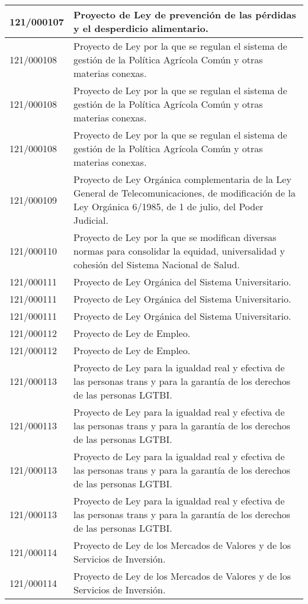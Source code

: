 {\begin{table}[H]
\begin{center}
\begin{tabularx}{\linewidth}{| l | X |}
\hline
121/000107 & Proyecto de Ley de prevención de las pérdidas y el desperdicio alimentario. \\
\hline
121/000108 & Proyecto de Ley por la que se regulan el sistema de gestión de la Política Agrícola Común y otras materias conexas. \\
\hline
121/000108 & Proyecto de Ley por la que se regulan el sistema de gestión de la Política Agrícola Común y otras materias conexas. \\
\hline
121/000108 & Proyecto de Ley por la que se regulan el sistema de gestión de la Política Agrícola Común y otras materias conexas. \\
\hline
121/000109 & Proyecto de Ley Orgánica complementaria de la Ley General de Telecomunicaciones, de modificación de la Ley Orgánica 6/1985, de 1 de julio, del Poder Judicial. \\
\hline
121/000110 & Proyecto de Ley por la que se modifican diversas normas para consolidar la equidad, universalidad y cohesión del Sistema Nacional de Salud. \\
\hline
121/000111 & Proyecto de Ley Orgánica del Sistema Universitario. \\
\hline
121/000111 & Proyecto de Ley Orgánica del Sistema Universitario. \\
\hline
121/000111 & Proyecto de Ley Orgánica del Sistema Universitario. \\
\hline
121/000112 & Proyecto de Ley de Empleo. \\
\hline
121/000112 & Proyecto de Ley de Empleo. \\
\hline
121/000113 & Proyecto de Ley para la igualdad real y efectiva de las personas trans y para la garantía de los derechos de las personas LGTBI. \\
\hline
121/000113 & Proyecto de Ley para la igualdad real y efectiva de las personas trans y para la garantía de los derechos de las personas LGTBI. \\
\hline
121/000113 & Proyecto de Ley para la igualdad real y efectiva de las personas trans y para la garantía de los derechos de las personas LGTBI. \\
\hline
121/000113 & Proyecto de Ley para la igualdad real y efectiva de las personas trans y para la garantía de los derechos de las personas LGTBI. \\
\hline
121/000114 & Proyecto de Ley de los Mercados de Valores y de los Servicios de Inversión. \\
\hline
121/000114 & Proyecto de Ley de los Mercados de Valores y de los Servicios de Inversión. \\

\end{tabularx}
\end{center}
\end{table}}
